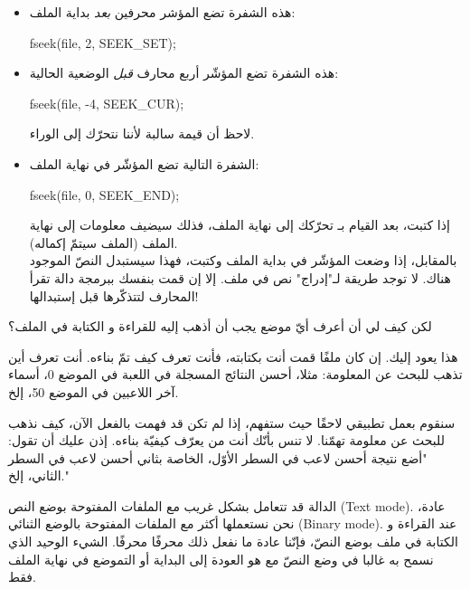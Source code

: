 \begin{itemize}
  \item هذه الشفرة تضع المؤشر محرفين
\textit{بعد}
بداية الملف:

  \begin{Csource}
fseek(file, 2, SEEK_SET);
  \end{Csource}

  \item هذه الشفرة تضع المؤشّر أربع محارف
\textit{قبل}
الوضعية الحالية:

  \begin{Csource}
fseek(file, -4, SEEK_CUR);
  \end{Csource}

  لاحظ أن قيمة
سالبة لأننا نتحرّك إلى الوراء.
  \item الشفرة التالية تضع المؤشّر في نهاية الملف:
 
  \begin{Csource}
fseek(file, 0, SEEK_END);
  \end{Csource}

  إذا كتبت، بعد القيام بـ
تحرّكك إلى نهاية الملف، فذلك سيضيف معلومات إلى نهاية الملف (الملف سيتمّ إكماله).\\
بالمقابل، إذا وضعت المؤشّر في بداية الملف وكتبت، فهذا سيستبدل النصّ الموجود هناك. لا توجد طريقة لـ"إدراج" نص في ملف. إلا إن قمت بنفسك ببرمجة دالة تقرأ المحارف لتتذكّرها قبل إستبدالها!
\end{itemize}

\begin{question}
لكن كيف لي أن أعرف أيّ موضع يجب أن أذهب إليه للقراءة و الكتابة في الملف؟
\end{question}

هذا يعود إليك. إن كان ملفًا قمت أنت بكتابته، فأنت تعرف كيف تمّ بناءه. أنت تعرف أين تذهب للبحث عن المعلومة: مثلا، أحسن النتائج المسجلة في اللعبة في الموضع 0، أسماء آخر اللاعبين في الموضع 50، إلخ.

سنقوم بعمل تطبيقي لاحقًا حيث ستفهم، إذا لم تكن قد فهمت بالفعل الآن، كيف نذهب للبحث عن معلومة تهمّنا. لا تنس بأنّك أنت من يعرّف كيفيّة بناءه. إذن عليك أن تقول: "أضع نتيجة أحسن لاعب في السطر الأوّل، الخاصة بثاني أحسن لاعب في السطر الثاني، إلخ."

\begin{warning}
الدالة
قد تتعامل بشكل غريب مع الملفات المفتوحة بوضع النص
(\textenglish{Text mode}).
عادة، نحن نستعملها أكثر مع الملفات المفتوحة بالوضع الثنائي
(\textenglish{Binary mode}).
عند القراءة و الكتابة في ملف بوضع النصّ، فإنّنا عادة ما نفعل ذلك محرفًا محرفًا. الشيء الوحيد الذي نسمح به غالبا في وضع النصّ مع
هو العودة إلى البداية أو التموضع في نهاية الملف فقط.
\end{warning}


